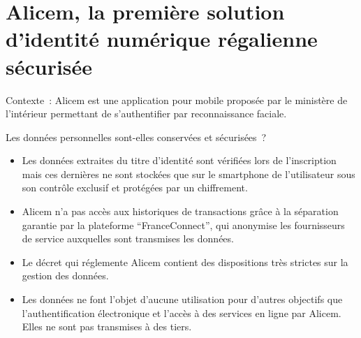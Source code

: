 \section{Alicem, la première solution d'identité numérique régalienne sécurisée}

\begin{em}
Contexte : Alicem est une application pour mobile proposée par le ministère de l'intérieur permettant de s'authentifier par reconnaissance faciale.
\end{em}

Les données personnelles sont-elles conservées et sécurisées ?

\begin{itemize}
\item Les données extraites du titre d'identité sont vérifiées lors de l'inscription mais ces dernières ne sont stockées que sur le smartphone de l'utilisateur sous son contrôle exclusif et protégées par un chiffrement.
\item Alicem n'a pas accès aux historiques de transactions grâce à la séparation garantie par la plateforme \enquote{FranceConnect}, qui anonymise les fournisseurs de service auxquelles sont transmises les données.
\item Le décret qui réglemente Alicem contient des dispositions très strictes sur la gestion des données.
\item Les données ne font l'objet d'aucune utilisation pour d'autres objectifs que l'authentification électronique et l'accès à des services en ligne par Alicem. Elles ne sont pas transmises à des tiers.
\end{itemize}
